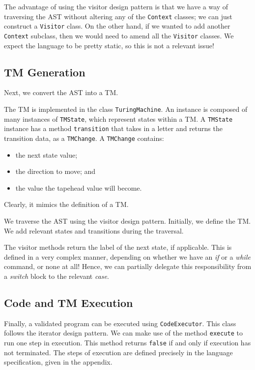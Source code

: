 The advantage of using the visitor design pattern is that we have a way of traversing the AST without altering any of the \texttt{Context} classes; we can just construct a \texttt{Visitor} class. On the other hand, if we wanted to add another \texttt{Context} subclass, then we would need to amend all the \texttt{Visitor} classes. We expect the language to be pretty static, so this is not a relevant issue!

\subsection{TM Generation}
Next, we convert the AST into a TM. 

The TM is implemented in the class \texttt{TuringMachine}. An instance is composed of many instances of \texttt{TMState}, which represent states within a TM. A \texttt{TMState} instance has a method \texttt{transition} that takes in a letter and returns the transition data, as a \texttt{TMChange}. A \texttt{TMChange} contains:
\begin{itemize}
    \item the next state value;
    \item the direction to move; and
    \item the value the tapehead value will become.
\end{itemize}
Clearly, it mimics the definition of a TM.

We traverse the AST using the visitor design pattern. Initially, we define the TM. We add relevant states and transitions during the traversal. 

The visitor methods return the label of the next state, if applicable. This is defined in a very complex manner, depending on whether we have an \textit{if} or a \textit{while} command, or none at all! Hence, we can partially delegate this responsibility from a \textit{switch} block to the relevant \textit{case}.

\subsection{Code and TM Execution}
Finally, a validated program can be executed using \texttt{CodeExecutor}. This class follows the iterator design pattern. We can make use of the method \texttt{execute} to run one step in execution. This method returns \texttt{false} if and only if execution has not terminated. The steps of execution are defined precisely in the language specification, given in the appendix.


